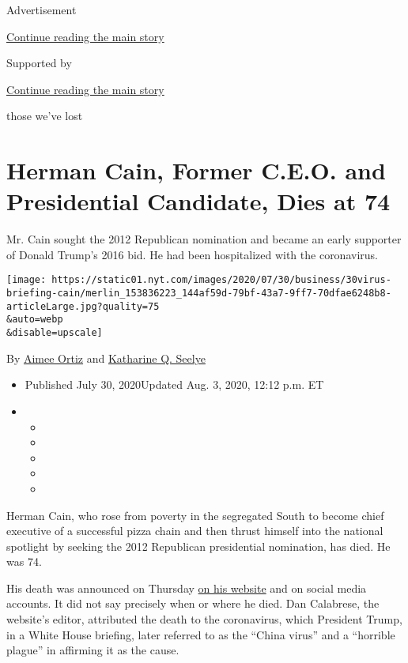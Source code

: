 Advertisement

\protect\hyperlink{after-top}{Continue reading the main story}

Supported by

\protect\hyperlink{after-sponsor}{Continue reading the main story}

those we've lost

\hypertarget{herman-cain-former-ceo-and-presidential-candidate-dies-at-74}{%
\section{Herman Cain, Former C.E.O. and Presidential Candidate, Dies at
74}\label{herman-cain-former-ceo-and-presidential-candidate-dies-at-74}}

Mr. Cain sought the 2012 Republican nomination and became an early
supporter of Donald Trump's 2016 bid. He had been hospitalized with the
coronavirus.

\texttt{[image: https://static01.nyt.com/images/2020/07/30/business/30virus-briefing-cain/merlin\_153836223\_144af59d-79bf-43a7-9ff7-70dfae6248b8-articleLarge.jpg?quality=75\\\&auto=webp\\\&disable=upscale]}

By \href{https://www.nytimes.com/by/aimee-ortiz}{Aimee Ortiz} and
\href{https://www.nytimes.com/by/katharine-q-seelye}{Katharine Q.
Seelye}

\begin{itemize}
\item
  Published July 30, 2020Updated Aug. 3, 2020, 12:12 p.m. ET
\item
  \begin{itemize}
  \item
  \item
  \item
  \item
  \item
  \end{itemize}
\end{itemize}

Herman Cain, who rose from poverty in the segregated South to become
chief executive of a successful pizza chain and then thrust himself into
the national spotlight by seeking the 2012 Republican presidential
nomination, has died. He was 74.

His death was announced on Thursday
\href{https://hermancain.com/heartbroken-world-poorer-herman-cain-gone-lord/?utm_source=twitter\&utm_medium=thenewvoice\&utm_content=2020-07-30}{on
his website} and on social media accounts. It did not say precisely when
or where he died. Dan Calabrese, the website's editor, attributed the
death to the coronavirus, which President Trump, in a White House
briefing, later referred to as the ``China virus'' and a ``horrible
plague'' in affirming it as the cause.

